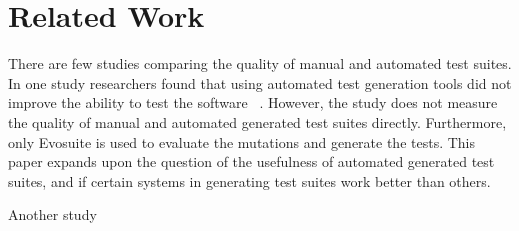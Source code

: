\section{Related Work}
\label{sec:related_work}
There are few studies comparing the quality of manual and automated test suites. In one study researchers found that using automated test generation tools did not improve the ability to test the software ~\cite{Fraser:2013:AWT:2483760.2483774}. However, the study does not measure the quality of manual and automated generated test suites directly. Furthermore, only Evosuite is used to evaluate the mutations and generate the tests. This paper expands upon the question of the usefulness of automated generated test suites, and if certain systems in generating test suites work better than others.

Another study